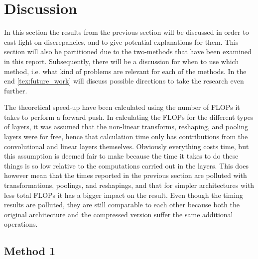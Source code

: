 \section{Discussion} \label{tex:discussion}

In this section the results from the previous section will be discussed in order to cast light on discrepancies, and to give potential explanations for them. This section will also be partitioned due to the two-methods that have been examined in this report. Subsequently, there will be a discussion for when to use which method, i.e. what kind of problems are relevant for each of the methods. In the end \autoref{tex:future_work} will discuss possible directions to take the research even further. 

The theoretical speed-up have been calculated using the number of FLOPs it takes to perform a forward push. In calculating the FLOPs for the different types of layers, it was assumed that the non-linear transforms, reshaping, and pooling layers were for free, hence that calculation time only has contributions from the convolutional and linear layers themselves. Obviously everything costs time, but this assumption is deemed fair to make because the time it takes to do these things is so low relative to the computations carried out in the layers. This does however mean that the times reported in the previous section are polluted with transformations, poolings, and reshapings, and that for simpler architectures with less total FLOPs it has a bigger impact on the result. Even though the timing results are polluted, they are still comparable to each other because both the original architecture and the compressed version suffer the same additional operations.

\subsection{Method 1}


